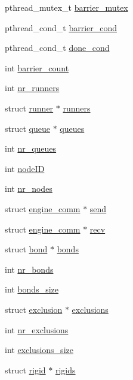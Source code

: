 \begin{DoxyCompactItemize}
pthread\-\_\-mutex\-\_\-t \hyperlink{structengine_a6d51d6453171f1a276982cb1a221db18}{barrier\-\_\-mutex}
\item 
pthread\-\_\-cond\-\_\-t \hyperlink{structengine_a07802036197963e79daf5ec2071c6e20}{barrier\-\_\-cond}
\item 
pthread\-\_\-cond\-\_\-t \hyperlink{structengine_a56d090cd02519c3812dd5cfeb9639511}{done\-\_\-cond}
\item 
int \hyperlink{structengine_ae42edcb32fe06022c2a46a343055d7e6}{barrier\-\_\-count}
\item 
int \hyperlink{structengine_a37e9992e3ad384431b607bcd606b3d9f}{nr\-\_\-runners}
\item 
struct \hyperlink{structrunner}{runner} $\ast$ \hyperlink{structengine_a148249829cb5f9708393abbb5a339d78}{runners}
\item 
struct \hyperlink{structqueue}{queue} $\ast$ \hyperlink{structengine_a46d7feb8d0f2e0c63a8931e32457d9b9}{queues}
\item 
int \hyperlink{structengine_aa2b93d405abc03aec20fd92c64d06786}{nr\-\_\-queues}
\item 
int \hyperlink{structengine_a2253df22e702f6bc02a8b7d839aec819}{node\-I\-D}
\item 
int \hyperlink{structengine_ac3bda6f3054bb742adafe73b3589501f}{nr\-\_\-nodes}
\item 
struct \hyperlink{structengine__comm}{engine\-\_\-comm} $\ast$ \hyperlink{structengine_a96cd0f48e5460fa6a5ee9f646a6cc667}{send}
\item 
struct \hyperlink{structengine__comm}{engine\-\_\-comm} $\ast$ \hyperlink{structengine_a2dd27e1a884588070ecd396f05178efc}{recv}
\item 
struct \hyperlink{structbond}{bond} $\ast$ \hyperlink{structengine_a8f2e5502792ec60f60f301d61cf8375d}{bonds}
\item 
int \hyperlink{structengine_ad29e940869fdac422337511d82a22ae6}{nr\-\_\-bonds}
\item 
int \hyperlink{structengine_a0b61fadd3e9b11fa981c051f7c6d9598}{bonds\-\_\-size}
\item 
struct \hyperlink{structexclusion}{exclusion} $\ast$ \hyperlink{structengine_a799c04b928898b9f3f1e9e99fefc75c9}{exclusions}
\item 
int \hyperlink{structengine_a56befbaa94d303065a80da7bec85acea}{nr\-\_\-exclusions}
\item 
int \hyperlink{structengine_abee3aaf9e387b0d762789d63ce370f2e}{exclusions\-\_\-size}
\item 
struct \hyperlink{structrigid}{rigid} $\ast$ \hyperlink{structengine_aaaf93c1958292b3b5c88b6ac34495aad}{rigids}

\end{DoxyCompactItemize}
